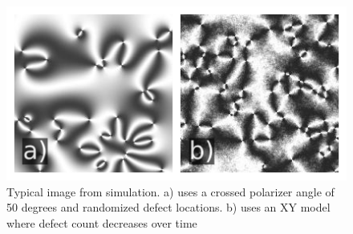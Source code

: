 \documentclass[prl,reprint,showpacs,floatfix,nofootinbib]{revtex4-1}
\begin{document}
\begin{figure}
  \includegraphics[width=\linewidth]{simulations.png}
  \caption{Typical image from simulation. a) uses a crossed polarizer angle of 50 degrees and randomized defect locations. b) uses an XY model where defect count decreases over time}
  \label{fig:RandomDefect}
\end{figure}

%


\end{document}

